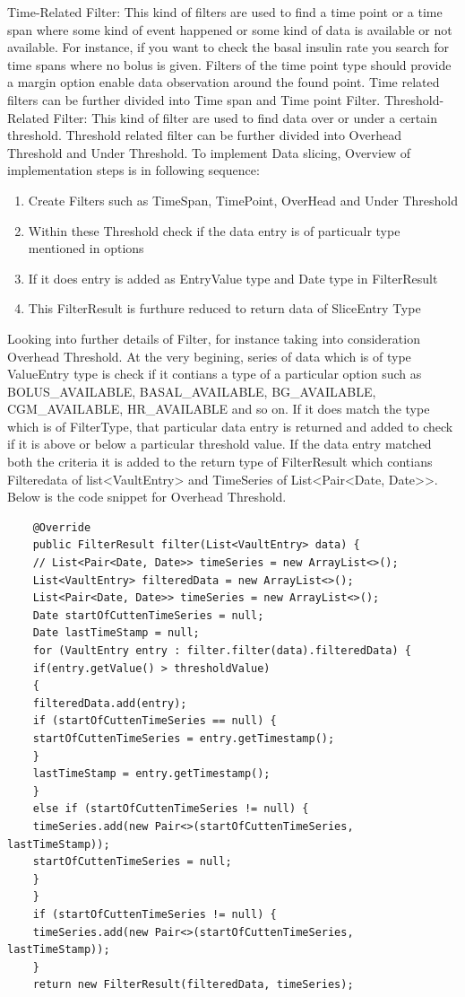 \documentclass[article,type=msc,colorback,accentcolor=tud9c,twoside,11pt]{tudthesis}
\begin{document}
	Time-Related Filter: This kind of filters are used to find a time point or a time span where some kind of event happened or some kind of data is available or not available. For instance, if you want to check the basal insulin rate you search for time spans where no bolus is given. Filters of the time point type should provide a margin option enable data observation around the found point. Time related filters can be further divided into Time span and Time point Filter. Threshold-Related Filter: This kind of filter are used to find data over or under a certain threshold. Threshold related filter can be further divided into Overhead Threshold and Under Threshold.
	To implement Data slicing, Overview of implementation steps is in following sequence:
	\begin{enumerate}
		\item Create Filters such as TimeSpan, TimePoint, OverHead and Under Threshold
		\item Within these Threshold check if the data entry is of particualr type mentioned in options 
		\item If it does entry is added as EntryValue type and Date type in FilterResult
		\item This FilterResult is furthure reduced to return data of SliceEntry Type
	\end{enumerate}
	Looking into further details of Filter, for instance taking into consideration Overhead Threshold. At the very begining, series of data which is of type ValueEntry type is check if it contians a type of a particular option such as BOLUS\_AVAILABLE, BASAL\_AVAILABLE, BG\_AVAILABLE, CGM\_AVAILABLE, HR\_AVAILABLE and so on. If it does match the type which is of FilterType, that particular data entry is returned and added to check if it is above or below a particular threshold value. If the data entry matched both the criteria it is added to the return type of FilterResult which contians Filteredata of list<VaultEntry> and TimeSeries of List<Pair<Date, Date>>. Below is the code snippet for Overhead Threshold.
	\begin{lstlisting}
	@Override
	public FilterResult filter(List<VaultEntry> data) {
	// List<Pair<Date, Date>> timeSeries = new ArrayList<>();
	List<VaultEntry> filteredData = new ArrayList<>();
	List<Pair<Date, Date>> timeSeries = new ArrayList<>();
	Date startOfCuttenTimeSeries = null;
	Date lastTimeStamp = null;
	for (VaultEntry entry : filter.filter(data).filteredData) {
	if(entry.getValue() > thresholdValue)
	{               
	filteredData.add(entry);
	if (startOfCuttenTimeSeries == null) {
	startOfCuttenTimeSeries = entry.getTimestamp();
	}
	lastTimeStamp = entry.getTimestamp();
	}
	else if (startOfCuttenTimeSeries != null) {
	timeSeries.add(new Pair<>(startOfCuttenTimeSeries, lastTimeStamp));
	startOfCuttenTimeSeries = null;
	}
	}
	if (startOfCuttenTimeSeries != null) {
	timeSeries.add(new Pair<>(startOfCuttenTimeSeries, lastTimeStamp));
	}
	return new FilterResult(filteredData, timeSeries); 
	\end{lstlisting}
\end{document}
